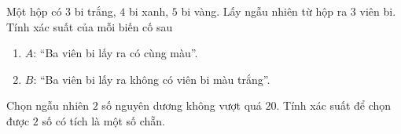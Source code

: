 \begin{bt}%
Một hộp có $ 3 $ bi trắng, $ 4 $ bi xanh, $ 5 $ bi vàng. Lấy ngẫu nhiên từ hộp ra $ 3 $ viên bi. Tính xác suất của mỗi biến cố sau
\begin{enumerate}
\item $ A $: “Ba viên bi lấy ra có cùng màu”.
\item $ B $: “Ba viên bi lấy ra không có viên bi màu trắng”.
\end{enumerate}
\end{bt}


\begin{bt}%
Chọn ngẫu nhiên $ 2 $ số nguyên dương không vượt quá $ 20 $. Tính xác suất để chọn được $ 2 $ số có tích là một số chẵn.
\end{bt}


